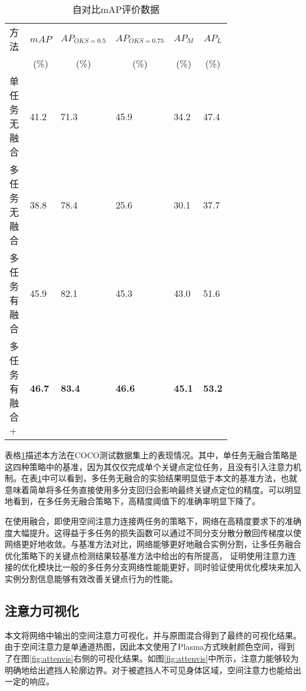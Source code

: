 \begin{table}[ht]
	\centering
	\caption{自对比mAP评价数据}
	\label{tab:mAPCOCOselfbenchmark}
	\begin{minipage}{0.8\linewidth}
		\begin{tabular}{p{0.25\linewidth}p{0.1\linewidth}<{\centering}p{0.1\linewidth}<{\centering}p{0.1\linewidth}<{\centering}p{0.1\linewidth}<{\centering}p{0.1\linewidth}<{\centering}}
			\hline
			方法 & \multicolumn{1}{c}{$mAP$} & \multicolumn{1}{c}{$AP_{OKS=0.5}$} & \multicolumn{1}{c}{$AP_{OKS=0.75}$} 
			& \multicolumn{1}{c}{$AP_M$} & \multicolumn{1}{c}{$AP_L$} \\
			
			& \multicolumn{1}{c}{(\%)}& \multicolumn{1}{c}{(\%)}&
			\multicolumn{1}{c}{(\%)}& \multicolumn{1}{c}{(\%)}& \multicolumn{1}{c}{
				(\%)}\\
			\hline
			单任务无融合 & 41.2 & 71.3 & 45.9& 34.2& 47.4\\
			多任务无融合 & 38.8 & 78.4 & 25.6 & 30.1 & 37.7 \\
			多任务有融合 & 45.9 & 82.1 & 45.3 & 43.0 & 51.6 \\
			多任务有融合+ & \textbf{46.7} & \textbf{83.4} & \textbf{46.6} & \textbf{45.1} & \textbf{53.2} \\
			\hline
		\end{tabular}
	\end{minipage}
\end{table}

表格\ref{tab:mAPCOCOselfbenchmark}描述本方法在COCO测试数据集上的表现情况。其中，单任务无融合策略是这四种策略中的基准，因为其仅仅完成单个关键点定位任务，且没有引入注意力机制。在表\ref{tab:mAPCOCOselfbenchmark}中可以看到，多任务无融合的实验结果明显低于本文的基准方法，也就意味着简单将多任务直接使用多分支回归会影响最终关键点定位的精度。可以明显地看到，在多任务无融合策略下，高精度阈值下的准确率明显下降了。

在使用融合，即使用空间注意力连接两任务的策略下，网络在高精度要求下的准确度大幅提升。这得益于多任务的损失函数可以通过不同分支分散分散回传梯度以使网络更好地收敛。与基准方法对比，网络能够更好地融合实例分割，让多任务融合优化策略下的关键点检测结果较基准方法中给出的有所提高， 证明使用注意力连接的优化模块比一般的多任务分支网络性能能更好，同时验证使用优化模块来加入实例分割信息能够有效改善关键点行为的性能。

\subsection{注意力可视化}
\label{sec:weaksuperatten}
本文将网络中输出的空间注意力可视化，并与原图混合得到了最终的可视化结果。由于空间注意力是单通道热图，因此本文使用了Plasma方式映射颜色空间，得到了在图\ref{fig:attenvis}右侧的可视化结果。如图\ref{fig:attenvis}中所示，注意力能够较为明确地给出遮挡人轮廓边界。对于被遮挡人不可见身体区域，空间注意力也能给出一定的响应。

